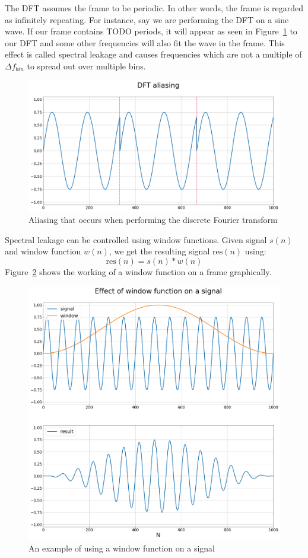 \documentclass[10pt,twocolumn]{article}
\begin{document}
The DFT assumes the frame to be periodic. In other words, the frame is regarded as infinitely repeating. For instance, say we are performing the DFT on a sine wave. If our frame contains TODO periods, it will appear as seen in Figure~\ref{fig:framealias} to our DFT and some other frequencies will also fit the wave in the frame. This effect is called spectral leakage and causes frequencies which are not a multiple of $\Delta f_{bin}$ to spread out over multiple bins.
\begin{figure}[H]
    \centering
    \includegraphics[width=\linewidth]{fig/aliasing.png}
    \caption{Aliasing that occurs when performing the discrete Fourier transform}
    \label{fig:framealias}
\end{figure}
Spectral leakage can be controlled using window functions. Given signal $s(n)$ and window function $w(n)$, we get the resulting signal $\text{res}(n)$ using:
\[ \text{res}(n) = s(n) * w(n) \]
Figure~\ref{fig:windowfunc} shows the working of a window function on a frame graphically.
\begin{figure}[H]
    \centering
    \includegraphics[width=\linewidth]{fig/window.png}
    \caption{An example of using a window function on a signal}
    \label{fig:windowfunc}
\end{figure}
\end{document}
